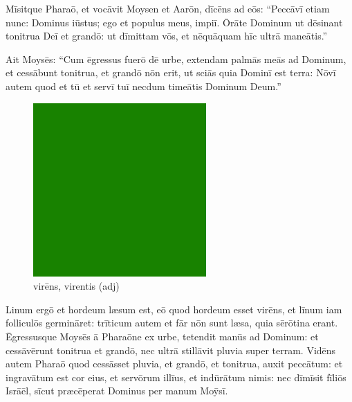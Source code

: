 Mīsitque Pharaō, et vocāvit Moysen et Aarōn,
dīcēns ad eōs: ``Peccāvī etiam nunc: Dominus iūstus; ego
et populus meus, impiī.  Ōrāte Dominum ut dēsinant
tonitrua Deī et grandō: ut dīmittam vōs, et nēquāquam hīc ultrā maneātis.''

Ait Moysēs: ``Cum ēgressus fuerō
dē urbe, extendam palmās meās ad Dominum, et cessābunt tonitrua, et grandō
nōn erit, ut sciās quia Dominī est terra: Nōvī autem quod et tū et
servī tuī necdum timeātis Dominum Deum.'' 

\begin{figure}[hp]
    \centering
    \includegraphics{green}
    \caption{virēns, virentis (adj)}
\end{figure}

Linum ergō et hordeum læsum est, eō quod
hordeum esset virēns, et līnum iam
folliculōs
germināret:  trīticum autem et
fār nōn sunt læsa, quia sērōtina erant. 
Ēgressusque Moysēs ā Pharaōne ex urbe, tetendit manūs ad Dominum: et
cessāvērunt tonitrua et grandō, nec ultrā stillāvit
pluvia super terram.  Vidēns autem Pharaō quod cessāsset
pluvia, et grandō, et tonitrua, auxit peccātum:  et
ingravātum est cor eius, et servōrum illīus, et indūrātum nimis: nec
dīmīsit fīliōs Isrāēl, sīcut præcēperat Dominus
per manum Moȳsī.
